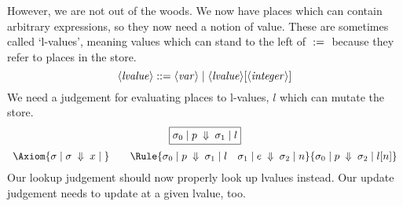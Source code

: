 \documentclass{article}
\begin{document}
However, we are not out of the woods. We now have places which can contain
arbitrary expressions, so they now need a notion of value. These are
sometimes called `l-values', meaning values which can stand to the left of $\;\mathtt{:=}\;$
because they refer to places in the store.
\[
  \langle \mathit{lvalue} \rangle ::= \langle \mathit{var} \rangle \;|\;\langle \mathit{lvalue} \rangle[\langle \mathit{integer} \rangle]
\]
We need a judgement for evaluating places to l-values, $l$ which can mutate the
store.
\[\begin{array}{c}
    \fbx{\JEv{\sigma_0}{p}{\sigma_1}{l}} \medskip \\
    \Axiom{\JEv{\sigma}{\sigma}x} \qquad
    \Rule{\JEv{\sigma_0}p{\sigma_1}l\quad
    \JEv{\sigma_1}e{\sigma_2}n}
    {\JEv{\sigma_0}p{\sigma_2}{l[n]}}
  \end{array}  \]
Our lookup judgement should now properly look up lvalues instead.
Our update judgement needs to update at a given lvalue, too.
  
\end{document}
